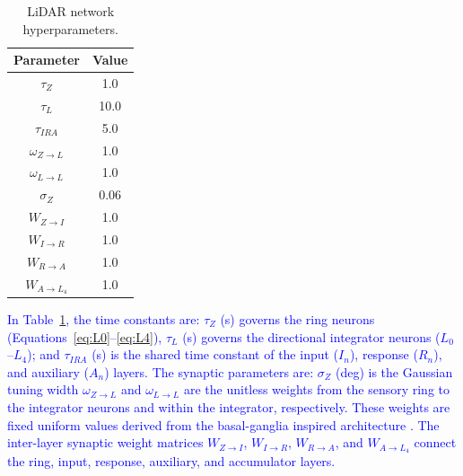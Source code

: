 \documentclass[preprint,12pt]{elsarticle}
\newcommand{\revblue}[1]{\textcolor{blue}{#1}}
\begin{document}
\begin{table}[t]
\centering
\caption{LiDAR network hyperparameters.}
\begin{tabular}{|c|c|}
\hline
\textbf{Parameter} & \textbf{Value} \\ \hline
$\tau_{Z}$ & 1.0 \\ \hline
$\tau_{L}$ & 10.0 \\ \hline
$\tau_{IRA}$ & 5.0 \\ \hline
$\omega_{Z\rightarrow L}$ & 1.0 \\\hline
$\omega_{L\rightarrow L}$ & 1.0 \\ \hline
$\sigma_{Z}$ & 0.06 \\ \hline
$W_{Z\rightarrow I}$ & 1.0 \\ \hline
$W_{I\rightarrow R}$ & 1.0 \\ \hline
$W_{R\rightarrow A}$ & 1.0 \\ \hline
$W_{A\rightarrow L_4}$ & 1.0 \\ \hline
\end{tabular}
\label{table:LiDAR}
\end{table}
\revblue{In Table~\ref{table:LiDAR}, the time constants are: $\tau_{Z}$ (s) governs the ring neurons (Equations~\eqref{eq:L0}–\eqref{eq:L4}), $\tau_{L}$ (s) governs the directional integrator neurons ($L_0$–$L_4$); and $\tau_{IRA}$ (s) is the shared time constant of the input ($I_n$), response ($R_n$), and auxiliary ($A_n$) layers.
The synaptic parameters are: $\sigma_{Z}$ (deg) is the Gaussian tuning width $\omega_{Z\rightarrow L}$ and $\omega_{L\rightarrow L}$ are the unitless weights from the sensory ring to the integrator neurons and within the integrator, respectively. These weights are fixed uniform values derived from the basal-ganglia inspired architecture \citep{sarvestani2013computational}.
The inter-layer synaptic weight matrices $W_{Z\rightarrow I}$, $W_{I\rightarrow R}$, $W_{R\rightarrow A}$, and $W_{A\rightarrow L_4}$ connect the ring, input, response, auxiliary, and accumulator layers.}
\end{document}
